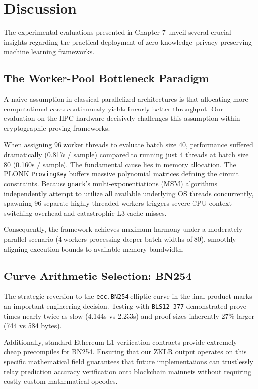 \chapter{Discussion}

The experimental evaluations presented in Chapter 7 unveil several crucial insights regarding the practical deployment of zero-knowledge, privacy-preserving machine learning frameworks.

\section{The Worker-Pool Bottleneck Paradigm}
A naive assumption in classical parallelized architectures is that allocating more computational cores continuously yields linearly better throughput. Our evaluation on the HPC hardware decisively challenges this assumption within cryptographic proving frameworks.

When assigning 96 worker threads to evaluate batch size 40, performance suffered dramatically (0.817s / sample) compared to running just 4 threads at batch size 80 (0.160s / sample). The fundamental cause lies in memory allocation. The PLONK \texttt{ProvingKey} buffers massive polynomial matrices defining the circuit constraints. Because \texttt{gnark}'s multi-exponentiations (MSM) algorithms independently attempt to utilize all available underlying OS threads concurrently, spawning 96 separate highly-threaded workers triggers severe CPU context-switching overhead and catastrophic L3 cache misses. 

Consequently, the framework achieves maximum harmony under a moderately parallel scenario (4 workers processing deeper batch widths of 80), smoothly aligning execution bounds to available memory bandwidth.

\section{Curve Arithmetic Selection: BN254}
The strategic reversion to the \texttt{ecc.BN254} elliptic curve in the final product marks an important engineering decision. Testing with \texttt{BLS12-377} demonstrated prove times nearly twice as slow (4.144s vs 2.233s) and proof sizes inherently 27\% larger (744 vs 584 bytes). 

Additionally, standard Ethereum L1 verification contracts provide extremely cheap precompiles for BN254. Ensuring that our ZKLR output operates on this specific mathematical field guarantees that future implementations can trustlessly relay prediction accuracy verification onto blockchain mainnets without requiring costly custom mathematical opcodes.
